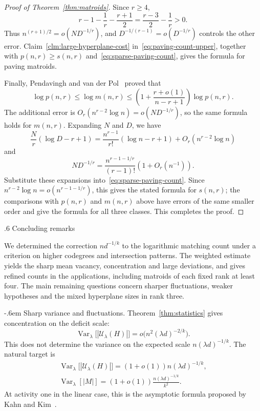 \documentclass[11pt,reqno]{amsart}
\makeatletter
\numberwithin{equation}{section}
\renewcommand{\section}{\@startsection{section}{1}%
    \z@{1.3\linespacing\@plus.5\linespacing\@minus.2\linespacing}%
    {.6\linespacing}%
    {\normalfont\scshape\centering}}
\renewcommand{\paragraph}{\@startsection{paragraph}{4}%
    \z@{.75\linespacing\@plus.2\linespacing\@minus.1\linespacing}%
    {-.6em}%
    {\normalfont\bfseries}}
\theoremstyle{plain}
\theoremstyle{definition}
\newcommand{\Var}{\operatorname{Var}}
\newcommand{\calU}{\mathcal U}
\makeatother
\begin{document}
\begin{proof}[Proof of Theorem~\ref{thm:matroids}]
    Since $r\ge4$,
    \[
        r-1-\frac1r-\frac{r+1}{2}=\frac{r-3}{2}-\frac1r>0.
    \]
    Thus $n^{(r+1)/2}=o(ND^{-1/r})$, and $D^{-1/(r-1)}=o(D^{-1/r})$ controls the other error.
    Claim~\ref{clm:large-hyperplane-cost} in~\eqref{eq:paving-count-upper}, together with $p(n,r)\ge s(n,r)$ and~\eqref{eq:sparse-paving-count}, gives the formula for paving matroids.

    Finally, Pendavingh and van der Pol~\cite[Theorem~3]{PvdP} proved that
    \[
        \log p(n,r)\le\log m(n,r)
        \le\left(1+\frac{r+o(1)}{n-r+1}\right)\log p(n,r).
    \]
    The additional error is $O_r(n^{r-2}\log n)=o(ND^{-1/r})$, so the same formula holds for $m(n,r)$.
    Expanding $N$ and $D$, we have
    \[
        \frac Nr(\log D-r+1)
        =\frac{n^{r-1}}{r!}(\log n-r+1)+O_r(n^{r-2}\log n)
    \]
    and
    \[
        ND^{-1/r}=\frac{n^{r-1-1/r}}{(r-1)!}(1+O_r(n^{-1})).
    \]
    Substitute these expansions into~\eqref{eq:sparse-paving-count}. Since $n^{r-2}\log n=o(n^{r-1-1/r})$, this gives the stated formula for $s(n,r)$; the comparisons with $p(n,r)$ and $m(n,r)$ above have errors of the same smaller order and give the formula for all three classes.
    This completes the proof.
\end{proof}


\section{Concluding remarks}\label{sec:concluding}

We determined the correction $nd^{-1/k}$ to the logarithmic matching count under a criterion on higher codegrees and intersection patterns.
The weighted estimate yields the sharp mean vacancy, concentration and large deviations, and gives refined counts in the applications, including matroids of each fixed rank at least four.
The main remaining questions concern sharper fluctuations, weaker hypotheses and the mixed hyperplane sizes in rank three.

\paragraph{Sharp variance and fluctuations.}
Theorem~\ref{thm:statistics} gives concentration on the deficit scale:
\[
    \Var_\lambda\bigl[|\calU_\lambda(H)|\bigr]=o\bigl(n^2(\lambda d)^{-2/k}\bigr).
\]
This does not determine the variance on the expected scale $n(\lambda d)^{-1/k}$.
The natural target is
\begin{equation}\label{eq:varianceasymptotic}
    \begin{gathered}
        \Var_\lambda\bigl[|\calU_\lambda(H)|\bigr]=(1+o(1))n(\lambda d)^{-1/k},\\
        \Var_\lambda[|M|]=(1+o(1))\frac{n(\lambda d)^{-1/k}}{k^2}.
    \end{gathered}
\end{equation}
At activity one in the linear case, this is the asymptotic formula proposed by Kahn and Kim~\cite{KK}.
\end{document}
